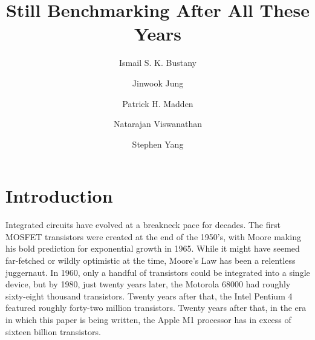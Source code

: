 \documentclass[sigconf]{acmart}
\begin{document}
\title{Still Benchmarking After All These Years}
\iffalse
\author{Blind Review}
\else
\author{Ismail S. K. Bustany}
\author{Jinwook Jung}
\author{Patrick H. Madden}
\author{Natarajan Viswanathan}
\author{Stephen Yang}


 
\fi
\begin{abstract}

\end{abstract}

\begin{CCSXML}
\end{CCSXML}



%


\maketitle

\section{Introduction}

Integrated circuits have evolved at a breakneck pace for decades.  The
first MOSFET transistors were created at the end of the 1950's, with
Moore\cite{Moore650114} making his bold prediction for exponential
growth in 1965.  While it might have seemed far-fetched or wildly
optimistic at the time, Moore's Law has been a relentless juggernaut.
In 1960, only a handful of transistors could be integrated into a
single device, but by 1980, just twenty years later, the Motorola
68000 had roughly sixty-eight thousand transistors.  Twenty years
after that, the Intel Pentium 4 featured roughly forty-two million
transistors.  Twenty years after that, in the era in which this paper
is being written, the Apple M1 processor has in excess of sixteen
billion transistors.
\end{document}
